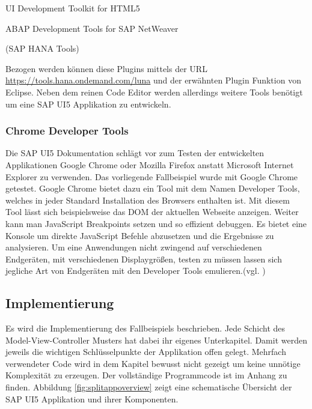 \vspace{1em}
\begin{compactitem}
  \item UI Development Toolkit for HTML5
  \item ABAP Development Tools for SAP NetWeaver
  \item (SAP HANA Tools)	    
\end{compactitem}
\vspace{1em}

Bezogen werden können diese Plugins mittels der URL \url{https://tools.hana.ondemand.com/luna} und der erwähnten Plugin Funktion von Eclipse. Neben dem reinen Code Editor werden allerdings weitere Tools benötigt um eine SAP UI5 Applikation zu entwickeln.

\subsubsection{Chrome Developer Tools}
Die SAP UI5 Dokumentation schlägt vor zum Testen der entwickelten Applikationen Google Chrome oder Mozilla Firefox anstatt Microsoft Internet Explorer zu verwenden. Das vorliegende Fallbeispiel wurde mit Google Chrome getestet. Google Chrome bietet dazu ein Tool mit dem Namen Developer Tools, welches in jeder Standard Installation des Browsers enthalten ist. Mit diesem Tool lässt sich beispielsweise das DOM der aktuellen Webseite anzeigen. Weiter kann man JavaScript Breakpoints setzen und so effizient debuggen. Es bietet eine Konsole um direkte JavaScript Befehle abzusetzen und die Ergebnisse zu analysieren. Um eine Anwendungen nicht zwingend auf verschiedenen Endgeräten, mit verschiedenen Displaygrößen, testen zu müssen lassen sich jegliche Art von Endgeräten mit den Developer Tools emulieren.(vgl. \cite{DevTools})



\subsection{Implementierung}
Es wird die Implementierung des Fallbeispiels beschrieben. Jede Schicht des Model-View-Controller Musters hat dabei ihr eigenes Unterkapitel. Damit werden jeweils die wichtigen Schlüsselpunkte der Applikation offen gelegt. Mehrfach verwendeter Code wird in dem Kapitel bewusst nicht gezeigt um keine unnötige Komplexität zu erzeugen. Der vollständige Programmcode ist im Anhang zu finden. Abbildung \ref{fig:splitappoverview} zeigt eine schematische Übersicht der SAP UI5 Applikation und ihrer Komponenten.


